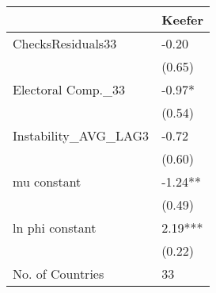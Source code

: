 {\scriptsize
\begin{tabular}{ll}
  \hline
 & Keefer \\ 
  \hline
ChecksResiduals33 & -0.20 \\ 
   & (0.65) \\ 
  Electoral Comp.\_33 & -0.97* \\ 
   & (0.54) \\ 
  Instability\_AVG\_LAG3 & -0.72 \\ 
   & (0.60) \\ 
  mu constant & -1.24** \\ 
   & (0.49) \\ 
  ln phi constant & 2.19*** \\ 
   & (0.22) \\ 
  No. of Countries & 33 \\ 
   \hline
\end{tabular}
}
